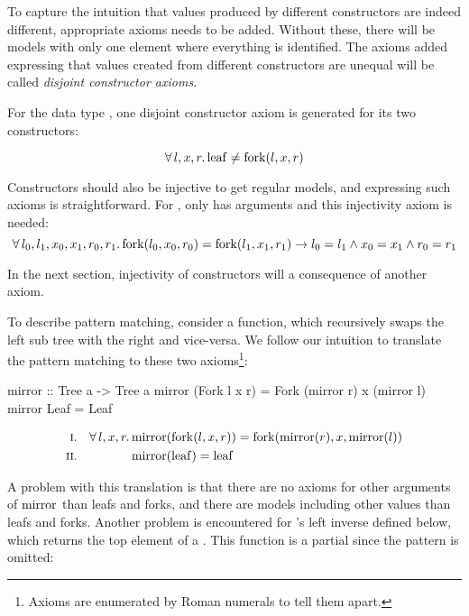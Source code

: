 \noindent
To capture the intuition that values produced by different
constructors are indeed different, appropriate axioms needs to be
added. Without these, there will be models with only one element where
everything is identified. The axioms added expressing that values
created from different constructors are unequal will be called
\emph{disjoint constructor axioms}.

\pagebreak
\noindent
For the data type , one disjoint constructor axiom is
generated for its two constructors:

\begin{equation*}
\forall \, l , x , r . \, \mathrm{leaf} \neq \mathrm{fork}(l,x,r)
\end{equation*}

Constructors should also be injective to get regular models, and
expressing such axioms is straightforward. For , only  has
arguments and this injectivity axiom is needed:
\begin{equation*}
\forall \, l_0 , l_1 , x_0 , x_1 , r_0 , r_1 . \, \mathrm{fork}(l_0,x_0,r_0) =
\mathrm{fork}(l_1,x_1,r_1) \rightarrow l_0 = l_1 \wedge x_0 = x_1 \wedge r_0 = r_1
\end{equation*}

In the next section, injectivity of constructors will a consequence of
another axiom.

To describe pattern matching, consider a  function, which
recursively swaps the left sub tree with the right and vice-versa. We
follow our intuition to translate the pattern matching to these
two axioms\footnote {Axioms are enumerated by Roman numerals to tell
  them apart.}:

\begin{code}
mirror :: Tree a -> Tree a
mirror (Fork l x r) = Fork (mirror r) x (mirror l)
mirror Leaf         = Leaf
\end{code}
\begin{align*}
\rom{1} && \faaa{l}{x}{r} & \fn{mirror}(\fn{fork}(l,x,r)) \eq \fn{fork}(\fn{mirror}(r),x,\fn{mirror}(l)) \\
\rom{2} &&                & \fn{mirror}(\fn{leaf}) \eq \fn{leaf}
\end{align*}

\noindent
A problem with this translation is that there are no axioms for other
arguments of $\mathrm{mirror}$ than leafs and forks, and there are models
including other values than leafs and forks. Another problem is
encountered for 's left inverse  defined below,
which returns the top element of a . This function is a partial
since the  pattern is omitted:

